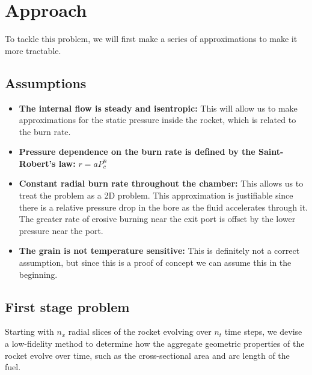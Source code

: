 	\section{Approach}
	
	To tackle this problem, we will first make a series of approximations to make it more tractable. 
		
	\subsection{Assumptions}
	\label{sec:assumptions}
	
	\begin{itemize}
		\item \textbf{The internal flow is steady and isentropic:} This will allow us to make approximations for the static pressure inside the rocket, which is related to the burn rate.
		\item \textbf{Pressure dependence on the burn rate is defined by the Saint-Robert's law:} $r = a P_c^n$
		\item \textbf{Constant radial burn rate throughout the chamber:} This allows us to treat the problem as a 2D problem. This approximation is justifiable since there is a relative pressure drop in the bore as the fluid accelerates through it. The greater rate of erosive burning near the exit port is offset by the lower pressure near the port. 
		\item \textbf{The grain is not temperature sensitive:} This is definitely not a correct assumption, but since this is a proof of concept we can assume this in the beginning. 
	\end{itemize}
	
	\subsection{First stage problem}
	
	Starting with $n_{x}$ radial slices of the rocket evolving over $n_t$ time steps, we devise a low-fidelity method to determine how the aggregate geometric properties of the rocket evolve over time, such as the cross-sectional area and arc length of the fuel. 

